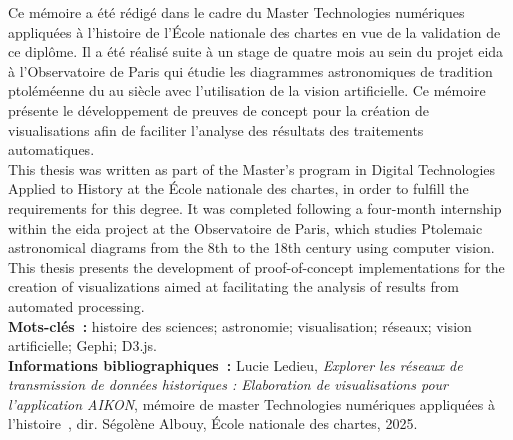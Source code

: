 \medskip	

Ce mémoire a été rédigé dans le cadre du Master Technologies numériques appliquées à l'histoire de l'École nationale des chartes en vue de la validation de ce diplôme. Il a été réalisé suite à un stage de quatre mois au sein du projet \gls{eida} à l'Observatoire de Paris qui étudie les diagrammes astronomiques de tradition ptoléméenne du \VIII au \XVIII siècle avec l'utilisation de la vision artificielle. Ce mémoire présente le développement de preuves de concept pour la création de visualisations afin de faciliter l'analyse des résultats des traitements automatiques. \\

This thesis was written as part of the Master's program in Digital Technologies Applied to History at the École nationale des chartes, in order to fulfill the requirements for this degree. It was completed following a four-month internship within the \gls{eida} project at the Observatoire de Paris, which studies Ptolemaic astronomical diagrams from the 8th to the 18th century using computer vision. This thesis presents the development of proof-of-concept implementations for the creation of visualizations aimed at facilitating the analysis of results from automated processing.\\

\textbf{Mots-clés~:} histoire des sciences; astronomie; visualisation; réseaux; vision artificielle; Gephi; D3.js.\\

\textbf{Informations bibliographiques~:} Lucie Ledieu, \textit{Explorer les réseaux de transmission de données historiques : Elaboration de visualisations pour l'application AIKON}, mémoire de master \og Technologies numériques appliquées à l'histoire~\fg, dir. Ségolène Albouy, École nationale des chartes, 2025.

\clearemptydoublepage